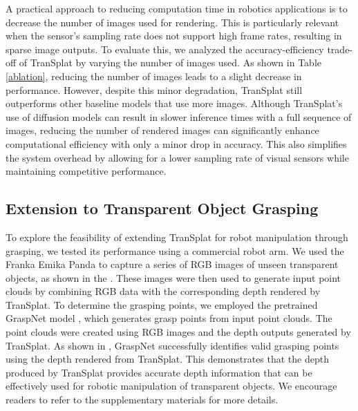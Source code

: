 A practical approach to reducing computation time in robotics applications is to decrease the number of images used for rendering. This is particularly relevant when the sensor's sampling rate does not support high frame rates, resulting in sparse image outputs. To evaluate this, we analyzed the accuracy-efficiency trade-off of TranSplat by varying the number of images used. As shown in Table \ref{ablation}, reducing the number of images leads to a slight decrease in performance. However, despite this minor degradation, TranSplat still outperforms other baseline models that use more images. Although TranSplat's use of diffusion models can result in slower inference times with a full sequence of images, reducing the number of rendered images can significantly enhance computational efficiency with only a minor drop in accuracy. This also simplifies the system overhead by allowing for a lower sampling rate of visual sensors while maintaining competitive performance.




\subsection{Extension to Transparent Object Grasping}

To explore the feasibility of extending TranSplat for robot manipulation through grasping, we tested its performance using a commercial robot arm. We used the Franka Emika Panda to capture a series of RGB images of unseen transparent objects, as shown in the . These images were then used to generate input point clouds by combining RGB data with the corresponding depth rendered by TranSplat. To determine the grasping points, we employed the pretrained GraspNet model \cite{fang2020graspnet}, which generates grasp points from input point clouds. The point clouds were created using RGB images and the depth outputs generated by TranSplat. As shown in , GraspNet successfully identifies valid grasping points using the depth rendered from TranSplat. This demonstrates that the depth produced by TranSplat provides accurate depth information that can be effectively used for robotic manipulation of transparent objects. We encourage readers to refer to the supplementary materials for more details.













